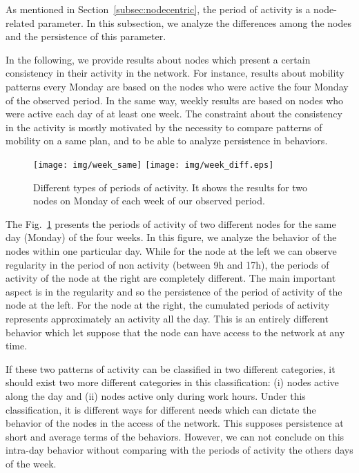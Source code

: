 \documentclass[a4paper]{sig-alternate-10pt}
\begin{document}
As mentioned in Section~\ref{subsec:nodecentric}, the period of
activity is a node-related parameter. In this subsection,
we analyze the differences among the nodes and the persistence
of this parameter.

In the following, we provide results about nodes which present
a certain consistency in their activity in the network. For
instance, results about mobility patterns every Monday are based on
the nodes who were active the four Monday of the observed
period. In the same way, weekly results are based on nodes who
were active each day of at least one week. The constraint about the
consistency in the activity is mostly motivated by the necessity to
compare patterns of mobility on a same plan, and to be able to
analyze persistence in behaviors.

\begin{figure}
\texttt{[image: img/week\_same]}
\texttt{[image: img/week\_diff.eps]}
\caption{Different types of periods of activity. It shows the
results for two nodes on Monday of each week of our observed
period.} \label{fig:period_pattern}
\end{figure}

The Fig.~\ref{fig:period_pattern} presents the periods of activity
of two different nodes for the same day (Monday) of the four
weeks. In this figure, we analyze the behavior of the nodes
within one particular day. While for the node at the left we
can observe regularity in the period of non activity (between 9h and
17h), the periods of activity of the node at the right are
completely different. The main important aspect is in the regularity
and so the persistence of the period of activity of the node
at the left. For the node at the right, the cumulated periods
of activity represents approximately an activity all the day. This
is an entirely different behavior which let suppose that the
node can have access to the network at any time.

If these two patterns of activity can be classified in two different
categories, it should exist two more different categories in this
classification: (i) nodes active along the day and (ii)
nodes active only during work hours. Under this
classification, it is different ways for different needs which can
dictate the behavior of the nodes in the access of the
network. This supposes persistence at short and average terms of the
behaviors. However, we can not conclude on this intra-day behavior
without comparing with the periods of activity the others days of
the week.
\end{document}
